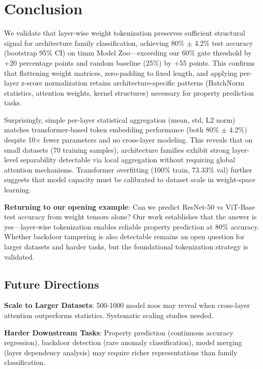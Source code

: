 \section{Conclusion}

We validate that layer-wise weight tokenization preserves sufficient structural signal for architecture family classification, achieving 80\% $\pm$ 4.2\% test accuracy (bootstrap 95\% CI) on timm Model Zoo—exceeding our 60\% gate threshold by +20 percentage points and random baseline (25\%) by +55 points. This confirms that flattening weight matrices, zero-padding to fixed length, and applying per-layer z-score normalization retains architecture-specific patterns (BatchNorm statistics, attention weights, kernel structures) necessary for property prediction tasks.

Surprisingly, simple per-layer statistical aggregation (mean, std, L2 norm) matches transformer-based token embedding performance (both 80\% $\pm$ 4.2\%) despite 10$\times$ fewer parameters and no cross-layer modeling. This reveals that on small datasets (70 training samples), architecture families exhibit strong layer-level separability detectable via local aggregation without requiring global attention mechanisms. Transformer overfitting (100\% train, 73.33\% val) further suggests that model capacity must be calibrated to dataset scale in weight-space learning.

\textbf{Returning to our opening example}: Can we predict ResNet-50 vs ViT-Base test accuracy from weight tensors alone? Our work establishes that the answer is yes—layer-wise tokenization enables reliable property prediction at 80\% accuracy. Whether backdoor tampering is also detectable remains an open question for larger datasets and harder tasks, but the foundational tokenization strategy is validated.

\subsection{Future Directions}

\textbf{Scale to Larger Datasets}: 500-1000 model zoos may reveal when cross-layer attention outperforms statistics. Systematic scaling studies needed.

\textbf{Harder Downstream Tasks}: Property prediction (continuous accuracy regression), backdoor detection (rare anomaly classification), model merging (layer dependency analysis) may require richer representations than family classification.

